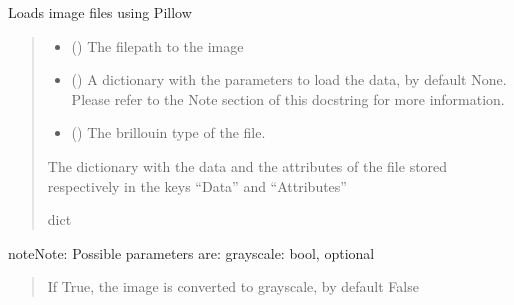 \documentclass[letterpaper,10pt,english]{sphinxmanual}
\begin{document}

\begin{fulllineitems}
\label{\detokenize{source/_autosummary/HDF5_BLS.load_data:HDF5_BLS.load_data.load_image_file}}
\pysigstartsignatures
\pysiglinewithargsret
{}
{\sphinxparamcomma {}\sphinxparamcomma {}}
{}
\pysigstopsignatures
\sphinxAtStartPar
Loads image files using Pillow
\begin{quote}\begin{description}
\begin{itemize}
\item {} 
\sphinxAtStartPar
{} () \textendash{} The filepath to the image

\item {} 
\sphinxAtStartPar
{} (\sphinxstyleliteralemphasis{\sphinxupquote{, }}) \textendash{} A dictionary with the parameters to load the data, by default None. Please refer to the Note section of this docstring for more information.

\item {} 
\sphinxAtStartPar
{} (\sphinxstyleliteralemphasis{\sphinxupquote{, }}) \textendash{} The brillouin type of the file.

\end{itemize}

\sphinxAtStartPar
The dictionary with the data and the attributes of the file stored respectively in the keys “Data” and “Attributes”

\sphinxAtStartPar
dict

\end{description}\end{quote}

\begin{sphinxadmonition}{note}{Note:}
\sphinxAtStartPar
Possible parameters are:
grayscale: bool, optional
\begin{quote}

\sphinxAtStartPar
If True, the image is converted to grayscale, by default False
\end{quote}
\end{sphinxadmonition}

\end{fulllineitems}
\end{document}
